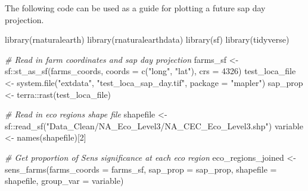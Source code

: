 \documentclass[
]{article}
\newenvironment{Shaded}{}{}
\newcommand{\AttributeTok}[1]{\textcolor[rgb]{0.49,0.56,0.16}{#1}}
\newcommand{\CommentTok}[1]{\textcolor[rgb]{0.38,0.63,0.69}{\textit{#1}}}
\newcommand{\DecValTok}[1]{\textcolor[rgb]{0.25,0.63,0.44}{#1}}
\newcommand{\FunctionTok}[1]{\textcolor[rgb]{0.02,0.16,0.49}{#1}}
\newcommand{\NormalTok}[1]{#1}
\newcommand{\OtherTok}[1]{\textcolor[rgb]{0.00,0.44,0.13}{#1}}
\newcommand{\SpecialCharTok}[1]{\textcolor[rgb]{0.25,0.44,0.63}{#1}}
\newcommand{\StringTok}[1]{\textcolor[rgb]{0.25,0.44,0.63}{#1}}
\begin{document}
The following code can be used as a guide for plotting a future sap day
projection.

\begin{Shaded}
\begin{Highlighting}[]
\FunctionTok{library}\NormalTok{(rnaturalearth)}
\FunctionTok{library}\NormalTok{(rnaturalearthdata)}
\FunctionTok{library}\NormalTok{(sf)}
\FunctionTok{library}\NormalTok{(tidyverse)}

\CommentTok{\# Read in farm coordinates and sap day projection}
\NormalTok{farms\_sf }\OtherTok{\textless{}{-}}\NormalTok{ sf}\SpecialCharTok{::}\FunctionTok{st\_as\_sf}\NormalTok{(farms\_coords, }\AttributeTok{coords =} \FunctionTok{c}\NormalTok{(}\StringTok{"long"}\NormalTok{, }\StringTok{"lat"}\NormalTok{), }\AttributeTok{crs =} \DecValTok{4326}\NormalTok{)}
\NormalTok{test\_loca\_file }\OtherTok{\textless{}{-}} \FunctionTok{system.file}\NormalTok{(}\StringTok{"extdata"}\NormalTok{, }\StringTok{"test\_loca\_sap\_day.tif"}\NormalTok{,}
                                \AttributeTok{package =} \StringTok{"mapler"}\NormalTok{)}
\NormalTok{sap\_prop }\OtherTok{\textless{}{-}}\NormalTok{ terra}\SpecialCharTok{::}\FunctionTok{rast}\NormalTok{(test\_loca\_file)}

\CommentTok{\# Read in eco regions shape file}
\NormalTok{shapefile }\OtherTok{\textless{}{-}}\NormalTok{ sf}\SpecialCharTok{::}\FunctionTok{read\_sf}\NormalTok{(}\StringTok{"Data\_Clean/NA\_Eco\_Level3/NA\_CEC\_Eco\_Level3.shp"}\NormalTok{)}
\NormalTok{variable }\OtherTok{\textless{}{-}} \FunctionTok{names}\NormalTok{(shapefile)[}\DecValTok{2}\NormalTok{]}

\CommentTok{\# Get proportion of Sen\textquotesingle{}s significance at each eco region}
\NormalTok{eco\_regions\_joined }\OtherTok{\textless{}{-}} \FunctionTok{sens\_farms}\NormalTok{(}\AttributeTok{farms\_coords =}\NormalTok{ farms\_sf, }\AttributeTok{sap\_prop =}\NormalTok{ sap\_prop,}
                                 \AttributeTok{shapefile =}\NormalTok{ shapefile, }\AttributeTok{group\_var =}\NormalTok{ variable)}


\end{Highlighting}
\end{Shaded}
\end{document}
